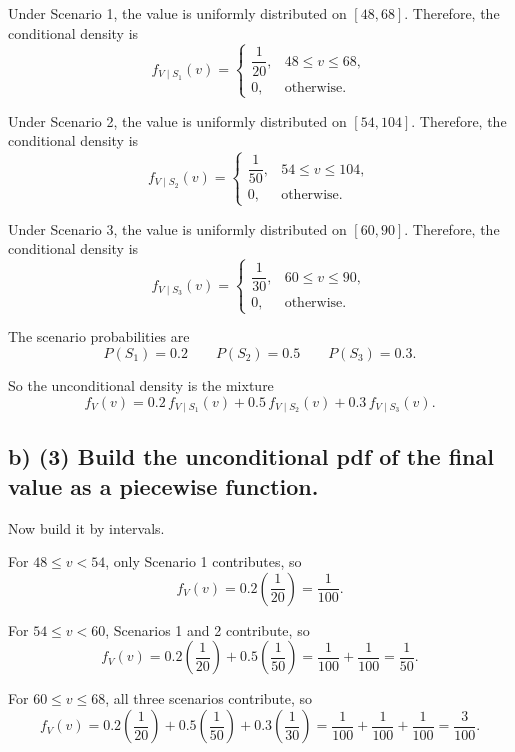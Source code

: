 Under Scenario 1, the value is uniformly distributed on $[48,68]$. Therefore, the conditional density is
\[
f_{V\mid S_1}(v)=
\begin{cases}
	\dfrac{1}{20}, & 48\le v\le 68,\\[4pt]
	0, & \text{otherwise.}
\end{cases}
\]

Under Scenario 2, the value is uniformly distributed on $[54,104]$. Therefore, the conditional density is
\[
f_{V\mid S_2}(v)=
\begin{cases}
	\dfrac{1}{50}, & 54\le v\le 104,\\[4pt]
	0, & \text{otherwise.}
\end{cases}
\]

Under Scenario 3, the value is uniformly distributed on $[60,90]$. Therefore, the conditional density is
\[
f_{V\mid S_3}(v)=
\begin{cases}
	\dfrac{1}{30}, & 60\le v\le 90,\\[4pt]
	0, & \text{otherwise.}
\end{cases}
\]

The scenario probabilities are
\[
P(S_1)=0.2
\qquad
P(S_2)=0.5
\qquad
P(S_3)=0.3.
\]

So the unconditional density is the mixture
\[
f_V(v)=0.2\,f_{V\mid S_1}(v)+0.5\,f_{V\mid S_2}(v)+0.3\,f_{V\mid S_3}(v).
\]



\subsection*{b) \textbf{(3)} Build the unconditional pdf of the final value as a piecewise function.}
\label{subsec:three-scenario-inventory-investment-c2-b}
Now build it by intervals.

For $48\le v<54$, only Scenario 1 contributes, so
\[
f_V(v)=0.2\left(\frac{1}{20}\right)=\frac{1}{100}.
\]

For $54\le v<60$, Scenarios 1 and 2 contribute, so
\[
f_V(v)=0.2\left(\frac{1}{20}\right)+0.5\left(\frac{1}{50}\right)
=\frac{1}{100}+\frac{1}{100}
=\frac{1}{50}.
\]

For $60\le v\le 68$, all three scenarios contribute, so
\[
f_V(v)=0.2\left(\frac{1}{20}\right)+0.5\left(\frac{1}{50}\right)+0.3\left(\frac{1}{30}\right)
=\frac{1}{100}+\frac{1}{100}+\frac{1}{100}
=\frac{3}{100}.
\]

